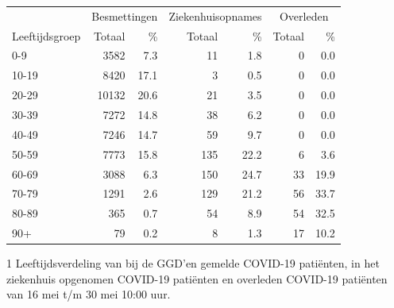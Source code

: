 \documentclass[
  english,
  man,floatsintext]{apa6}
\begin{document}
\begin{table}
\centering\begingroup\fontsize{11}{13}\selectfont

\begin{threeparttable}
\begin{tabular}{lrrrrrr}
\toprule
\multicolumn{1}{c}{ } & \multicolumn{2}{c}{Besmettingen} & \multicolumn{2}{c}{Ziekenhuisopnames} & \multicolumn{2}{c}{Overleden} \\
\cmidrule(l{3pt}r{3pt}){2-3} \cmidrule(l{3pt}r{3pt}){4-5} \cmidrule(l{3pt}r{3pt}){6-7}
Leeftijdsgroep & Totaal & \% & Totaal & \% & Totaal & \%\\
\midrule
0-9 & 3582 & 7.3 & 11 & 1.8 & 0 & 0.0\\
10-19 & 8420 & 17.1 & 3 & 0.5 & 0 & 0.0\\
20-29 & 10132 & 20.6 & 21 & 3.5 & 0 & 0.0\\
30-39 & 7272 & 14.8 & 38 & 6.2 & 0 & 0.0\\
40-49 & 7246 & 14.7 & 59 & 9.7 & 0 & 0.0\\
50-59 & 7773 & 15.8 & 135 & 22.2 & 6 & 3.6\\
60-69 & 3088 & 6.3 & 150 & 24.7 & 33 & 19.9\\
70-79 & 1291 & 2.6 & 129 & 21.2 & 56 & 33.7\\
80-89 & 365 & 0.7 & 54 & 8.9 & 54 & 32.5\\
90+ & 79 & 0.2 & 8 & 1.3 & 17 & 10.2\\
\bottomrule
\end{tabular}
\begin{tablenotes}
\item[1] Leeftijdsverdeling van bij de GGD’en gemelde COVID-19 patiënten, in het ziekenhuis opgenomen COVID-19 patiënten en overleden COVID-19 patiënten van 16 mei t/m 30 mei 10:00 uur.
\end{tablenotes}
\end{threeparttable}
\endgroup{}
\end{table}

\newpage
\end{document}
